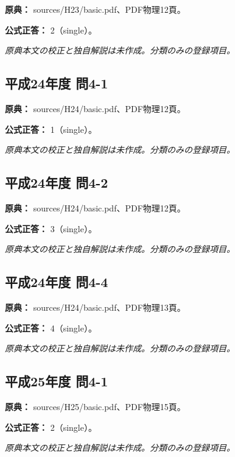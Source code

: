 \noindent\textbf{原典：} sources/H23/basic.pdf、PDF物理12頁。

\textbf{公式正答：} 2（single）。

\par\textit{原典本文の校正と独自解説は未作成。分類のみの登録項目。}

\subsection{平成24年度 問4-1}
\label{q:h24-reg-basic-4-1}

\noindent\textbf{原典：} sources/H24/basic.pdf、PDF物理12頁。

\textbf{公式正答：} 1（single）。

\par\textit{原典本文の校正と独自解説は未作成。分類のみの登録項目。}

\subsection{平成24年度 問4-2}
\label{q:h24-reg-basic-4-2}

\noindent\textbf{原典：} sources/H24/basic.pdf、PDF物理12頁。

\textbf{公式正答：} 3（single）。

\par\textit{原典本文の校正と独自解説は未作成。分類のみの登録項目。}

\subsection{平成24年度 問4-4}
\label{q:h24-reg-basic-4-4}

\noindent\textbf{原典：} sources/H24/basic.pdf、PDF物理13頁。

\textbf{公式正答：} 4（single）。

\par\textit{原典本文の校正と独自解説は未作成。分類のみの登録項目。}

\subsection{平成25年度 問4-1}
\label{q:h25-reg-basic-4-1}

\noindent\textbf{原典：} sources/H25/basic.pdf、PDF物理15頁。

\textbf{公式正答：} 2（single）。

\par\textit{原典本文の校正と独自解説は未作成。分類のみの登録項目。}

